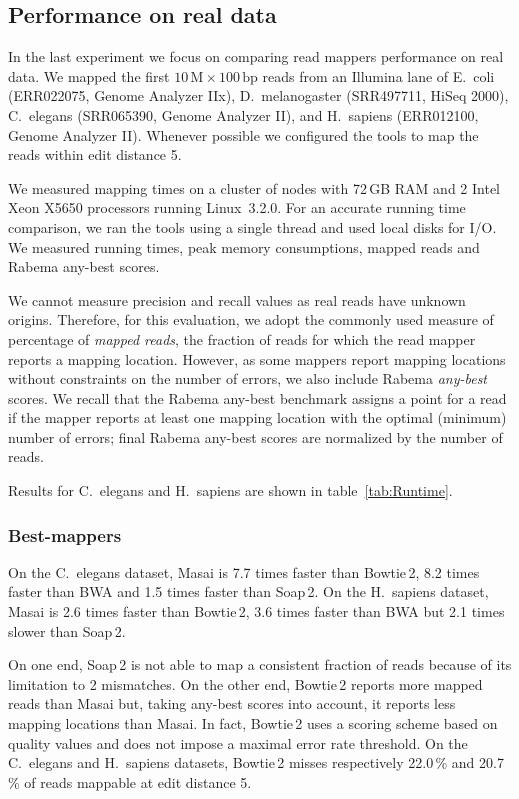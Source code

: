 \subsection{Performance on real data}

In the last experiment we focus on comparing read mappers performance on real data.
We mapped the first $10\,\text{M}\times 100\,\text{bp}$ reads from an Illumina lane of E.~coli (ERR022075, Genome Analyzer IIx), D.~melanogaster (SRR497711, HiSeq 2000), C.~elegans (SRR065390, Genome Analyzer II), and H.~sapiens (ERR012100, Genome Analyzer II).
Whenever possible we configured the tools to map the reads within edit distance 5.

We measured mapping times on a cluster of nodes with 72\,GB RAM and 2 Intel Xeon X5650 processors running Linux~3.2.0.
For an accurate running time comparison, we ran the tools using a single thread and used local disks for I/O.
We measured running times, peak memory consumptions, mapped reads and Rabema any-best scores.

We cannot measure precision and recall values as real reads have unknown origins.
Therefore, for this evaluation, we adopt the commonly used measure of percentage of \emph{mapped reads}, \ie the fraction of reads for which the read mapper reports a mapping location.
However, as some mappers report mapping locations without constraints on the number of errors, we also include Rabema \emph{any-best} scores.
We recall that the Rabema any-best benchmark assigns a point for a read if the mapper reports at least one mapping location with the optimal (minimum) number of errors;
final Rabema any-best scores are normalized by the number of reads.

Results for C.~elegans and H.~sapiens are shown in table~\ref{tab:Runtime}.

\subsubsection{Best-mappers}
On the C.~elegans dataset, Masai is 7.7 times faster than Bowtie\,2, 8.2 times faster than BWA and 1.5 times faster than Soap\,2.
On the H.~sapiens dataset, Masai is 2.6 times faster than Bowtie\,2, 3.6 times faster than BWA but 2.1 times slower than Soap\,2.

On one end, Soap\,2 is not able to map a consistent fraction of reads because of its limitation to 2 mismatches.
On the other end, Bowtie\,2 reports more mapped reads than Masai but, taking any-best scores into account, it reports less mapping locations than Masai.
In fact, Bowtie\,2 uses a scoring scheme based on quality values and does not impose a maximal error rate threshold.
On the C.~elegans and H.~sapiens datasets, Bowtie\,2 misses respectively 22.0\,\% and 20.7\,\% of reads mappable at edit distance 5.

